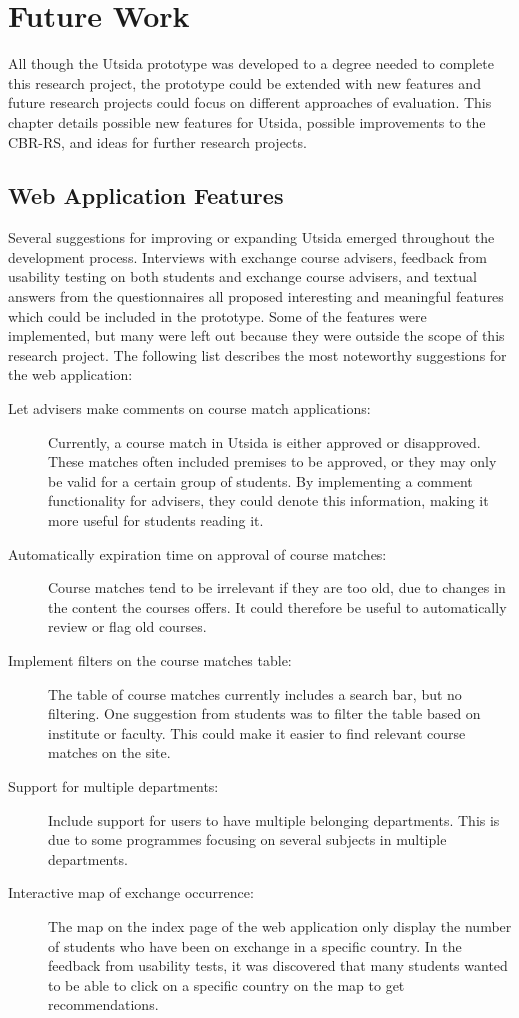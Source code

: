 \chapter{Future Work}

All though the Utsida prototype was developed to a degree needed to complete this research project, the prototype could be extended with new features and future research projects could focus on different approaches of evaluation. This chapter details possible new features for Utsida, possible improvements to the CBR-RS, and ideas for further research projects.

\section{Web Application Features}

Several suggestions for improving or expanding Utsida emerged throughout the development process. Interviews with exchange course advisers, feedback from usability testing on both students and exchange course advisers, and textual answers from the questionnaires all proposed interesting and meaningful features which could be included in the prototype. Some of the features were implemented, but many were left out because they were outside the scope of this research project. The following list describes the most noteworthy suggestions for the web application:

\begin{description}
    \item[Let advisers make comments on course match applications:] Currently, a course match in Utsida is either approved or disapproved. These matches often included premises to be approved, or they may only be valid for a certain group of students. By implementing a comment functionality for advisers, they could denote this information, making it more useful for students reading it.
    \item[Automatically expiration time on approval of course matches:] Course matches tend to be irrelevant if they are too old, due to changes in the content the courses offers. It could therefore be useful to automatically review or flag old courses.
    \item[Implement filters on the course matches table:] The table of course matches currently includes a search bar, but no filtering. One suggestion from students was to filter the table based on institute or faculty. This could make it easier to find relevant course matches on the site.
    \item[Support for multiple departments:] Include support for users to have multiple belonging departments. This is due to some programmes focusing on several subjects in multiple departments.
    \item[Interactive map of exchange occurrence:] The map on the index page of the web application only display the number of students who have been on exchange in a specific country. In the feedback from usability tests, it was discovered that many students wanted to be able to click on a specific country on the map to get recommendations.
\end{description}

